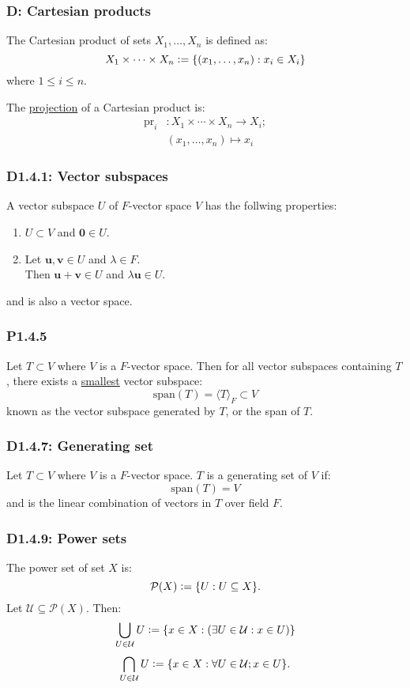 \documentclass{article}
\newcommand{\deq}{\vcentcolon=}
\newcommand{\vc}[1]{\boldsymbol{#1}}
\begin{document}
\begin{multicols*}{3}
\subsubsection*{D: Cartesian products}
The Cartesian product of sets $X_1,\dots,X_n$
is defined as:
$$X_1\times\cdots\times X_n
\deq\{(x_1,\dots,x_n):x_i\in X_i\}$$
where $1\leq i\leq n$.

The \underline{projection} of a Cartesian product is:
\begin{align*}
    \text{pr}_i &:X_1\times\cdots\times X_n
    \rightarrow X_i; \\
    &(x_1,\dots,x_n)\mapsto x_i
\end{align*}

\subsubsection*{D1.4.1: Vector subspaces}
A vector subspace $U$ of $F$-vector space $V$
has the follwing properties:
\begin{enumerate}
    \item $U\subset V$ and $\vc{0}\in U$.
    \item Let $\vc{u},\vc{v}\in U$
    and $\lambda\in F$. \\ Then
    $\vc{u}+\vc{v}\in U$ and $\lambda\vc{u}\in U$.
\end{enumerate}
and is also a vector space.

\subsubsection*{P1.4.5}
Let $T\subset V$ where $V$ is a $F$-vector space.
Then for all vector subspaces containing $T$,
there exists a \underline{smallest} vector subspace:
$$\text{span}(T)=\langle T\rangle_F\subset V$$
known as the vector subspace generated by $T$,
or the span of $T$.

\subsubsection*{D1.4.7: Generating set}
Let $T\subset V$ where $V$ is a $F$-vector space.
$T$ is a generating set of $V$ if:
$$\text{span}(T)=V$$
and is the linear combination of vectors in $T$
over field $F$.

\subsubsection*{D1.4.9: Power sets}
The power set of set $X$ is:
$$\mathcal{P}(X)\deq\{U:U\subseteq X\}.$$
Let $\mathcal{U}\subseteq\mathcal{P}(X)$. Then:
$$\bigcup_{U\in\mathcal{U}}U
\deq\{x\in X:(\exists U\in\mathcal{U}:x\in U)\}$$
$$\bigcap_{U\in\mathcal{U}}U
\deq\{x\in X:\forall U\in\mathcal{U};x\in U\}.$$


\end{multicols*}
\end{document}
